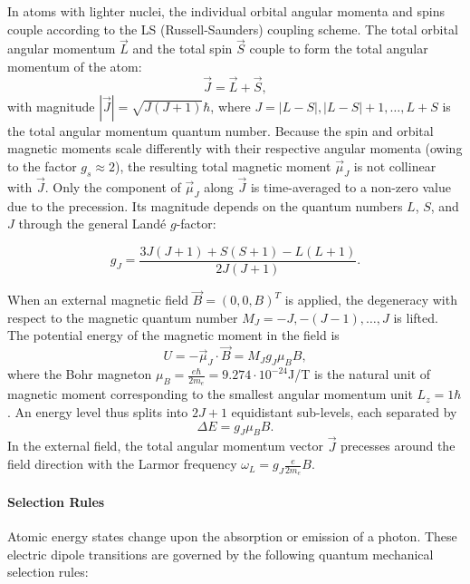 \documentclass{article}
\begin{document}
In atoms with lighter nuclei, the individual orbital angular momenta and spins couple according to the LS (Russell-Saunders) coupling scheme. The total orbital angular momentum $\vec{L}$ and the total spin $\vec{S}$ couple to form the total angular momentum of the atom:
\begin{equation}
    \vec{J} = \vec{L} + \vec{S},
\end{equation}
with magnitude $|\vec{J}| = \sqrt{J(J+1)}\hbar$, where $J = |L-S|, |L-S|+1, \ldots, L+S$ is the total angular momentum quantum number. Because the spin and orbital magnetic moments scale differently with their respective angular momenta (owing to the factor $g_s \approx 2$), the resulting total magnetic moment $\vec{\mu}_J$ is not collinear with $\vec{J}$. Only the component of $\vec{\mu}_J$ along $\vec{J}$ is time-averaged to a non-zero value due to the precession. Its magnitude depends on the quantum numbers $L$, $S$, and $J$ through the general Landé $g$-factor:

\begin{equation}
    g_J = \frac{3J(J+1) + S(S+1) - L(L+1)}{2J(J+1)}.
    \label{eq:lande}
\end{equation}

When an external magnetic field $\vec{B} = (0, 0, B)^T$ is applied, the degeneracy with respect to the magnetic quantum number $M_J = -J, -(J-1), \ldots, J$ is lifted. The potential energy of the magnetic moment in the field is
\begin{equation}
    U = -\vec{\mu}_J \cdot \vec{B} = M_J g_J \mu_B B,
\end{equation}
where the Bohr magneton $\mu_B = \frac{e\hbar}{2m_e} = 9.274 \cdot 10^{-24}$J/T is the natural unit of magnetic moment corresponding to the smallest angular momentum unit $L_z = 1\hbar$. An energy level thus splits into $2J+1$ equidistant sub-levels, each separated by
\begin{equation}
    \Delta E = g_J \mu_B B.
\end{equation}
In the external field, the total angular momentum vector $\vec{J}$ precesses around the field direction with the Larmor frequency $\omega_L = g_J\frac{e}{2m_e}B$.

\paragraph{Selection Rules}
Atomic energy states change upon the absorption or emission of a photon. These electric dipole transitions are governed by the following quantum mechanical selection rules:
\end{document}
